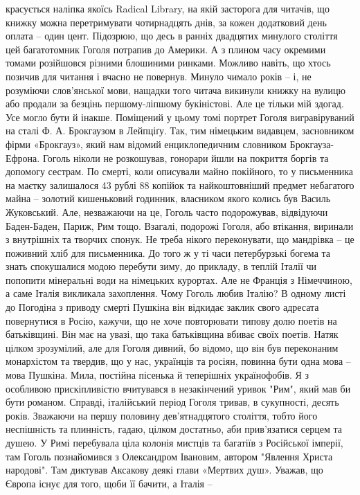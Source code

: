красується наліпка якоїсь Radical Library, на якій засторога для читачів, що
книжку можна перетримувати чотирнадцять днів, за кожен додатковий день оплата –
один цент. Підозрюю, що десь в ранніх двадцятих минулого століття цей
багатотомник Гоголя потрапив до Америки. А з плином часу окремими томами
розійшовся різними блошиними ринками. Можливо навіть, що хтось позичив для
читання і вчасно не повернув. Минуло чимало років – і, не розуміючи
слов’янської мови, нащадки того читача викинули книжку на вулицю або продали за
безцінь першому-ліпшому букіністові. Але це тільки мій здогад. Усе могло бути й
інакше. Поміщений у цьому томі портрет Гоголя вигравіруваний на сталі Ф. А.
Брокгаузом в Лейпціґу. Так, тим німецьким видавцем, засновником фірми
«Брокгауз», який нам відомий енциклопедичним словником Брокгауза-Ефрона. Гоголь
ніколи не розкошував, гонорари йшли на покриття боргів та допомогу сестрам. По
смерті, коли описували майно покійного, то у письменника на маєтку залишалося
43 рублі 88 копійок та найкоштовніший предмет небагатого майна – золотий
кишеньковий годинник, власником якого колись був Василь Жуковський. Але,
незважаючи на це, Гоголь часто подорожував, відвідуючи Баден-Баден, Париж, Рим
тощо. Взагалі, подорожі Гоголя, або втікання, виринали з внутрішніх та творчих
спонук. Не треба нікого переконувати, що мандрівка – це поживний хліб для
письменника. До того ж у ті часи петербурзькі богема та знать спокушалися модою
перебути зиму, до прикладу, в теплій Італії чи попопити мінеральні води на
німецьких курортах. Але не Франція з Німеччиною, а саме Італія викликала
захоплення. Чому Гоголь любив Італію? В одному листі до Погодіна з приводу
смерті Пушкіна він відкидає заклик свого адресата повернутися в Росію, кажучи,
що не хоче повторювати типову долю поетів на батьківщині. Він має на увазі, що
така батьківщина вбиває своїх поетів. Натяк цілком зрозумілий, але для Гоголя
дивний, бо відомо, що він був переконаним монархістом та твердив, що у нас,
українців та росіян, повинна бути одна мова – мова Пушкіна. Мила, постійна
пісенька й теперішніх українофобів. Я з особливою прискіпливістю вчитувався в
незакінчений уривок "Рим", який мав би бути романом. Справді, італійський
період Гоголя тривав, в сукупності, десять років. Зважаючи на першу половину
дев’ятнадцятого століття, тобто його неспішність та плинність, гадаю, цілком
достатньо, аби прив’язатися серцем та душею. У Римі перебувала ціла колонія
мистців та багатіїв з Російської імперії, там Гоголь познайомився з Олександром
Івановим, автором "Явлення Христа народові". Там диктував Аксакову деякі глави
«Мертвих душ». Уважав, що Європа існує для того, щоби її бачити, а Італія –
